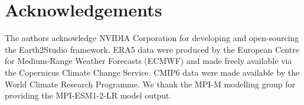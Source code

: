 \documentclass[12pt,a4paper]{article}
\begin{document}
\section*{Acknowledgements}

The authors acknowledge NVIDIA Corporation for developing and open-sourcing
the Earth2Studio framework. ERA5 data were produced by the European Centre
for Medium-Range Weather Forecasts (ECMWF) and made freely available via
the Copernicus Climate Change Service. CMIP6 data were made available by
the World Climate Research Programme. We thank the MPI-M modelling group
for providing the MPI-ESM1-2-LR model output.



\end{document}
